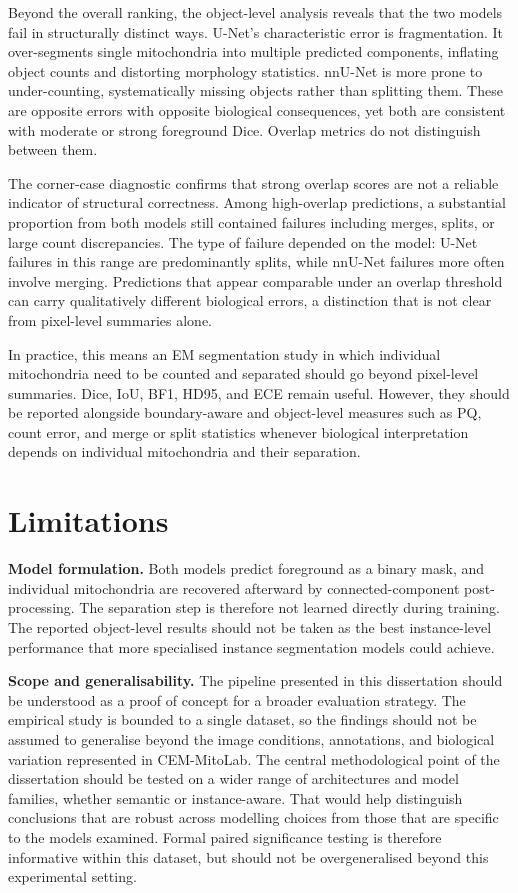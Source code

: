 \documentclass[logo,bsc,singlespacing,parskip,online]{infthesis}
\begin{document}
Beyond the overall ranking, the object-level analysis reveals that the two models
fail in structurally distinct ways. U-Net's characteristic error is fragmentation.
It over-segments single mitochondria into multiple predicted components, inflating
object counts and distorting morphology statistics. nnU-Net is more prone to
under-counting, systematically missing objects rather than splitting them. These
are opposite errors with opposite biological consequences, yet both are consistent
with moderate or strong foreground Dice. Overlap metrics do not distinguish
between them.

The corner-case diagnostic confirms that strong overlap scores are not a reliable
indicator of structural correctness. Among high-overlap predictions, a substantial
proportion from both models still contained failures including merges, splits, or
large count discrepancies. The type of failure depended on the model: U-Net
failures in this range are predominantly splits, while nnU-Net failures more often
involve merging. Predictions that appear comparable under an overlap threshold can
carry qualitatively different biological errors, a distinction that is
not clear from pixel-level summaries alone.

In practice, this means an EM segmentation study in which individual mitochondria 
need to be counted and separated should go beyond pixel-level summaries. Dice,
IoU, BF1, HD95, and ECE remain useful. However, they should be reported
alongside boundary-aware and object-level measures such as PQ, count error,
and merge or split statistics whenever biological interpretation depends on
individual mitochondria and their separation.



\section{Limitations}
\label{sec:limitations}

\noindent\textbf{Model formulation.} Both models predict foreground as a
binary mask, and individual mitochondria are recovered afterward by
connected-component post-processing. The separation step is therefore not
learned directly during training. The reported object-level results should not be taken as
the best instance-level performance that more specialised instance
segmentation models could achieve.

\noindent\textbf{Scope and generalisability.} The pipeline presented in this
dissertation should be understood as a proof of concept for a broader
evaluation strategy. The empirical study is bounded to a single
dataset, so the findings should not be assumed to generalise beyond the image
conditions, annotations, and biological variation represented in CEM-MitoLab.
The central methodological point of the dissertation should be tested on a
wider range of architectures and model families, whether semantic or
instance-aware. That would help distinguish conclusions that are robust across
modelling choices from those that are specific to the models examined. Formal paired
significance testing is therefore informative within this dataset, but should
not be overgeneralised beyond this experimental setting.
\end{document}

